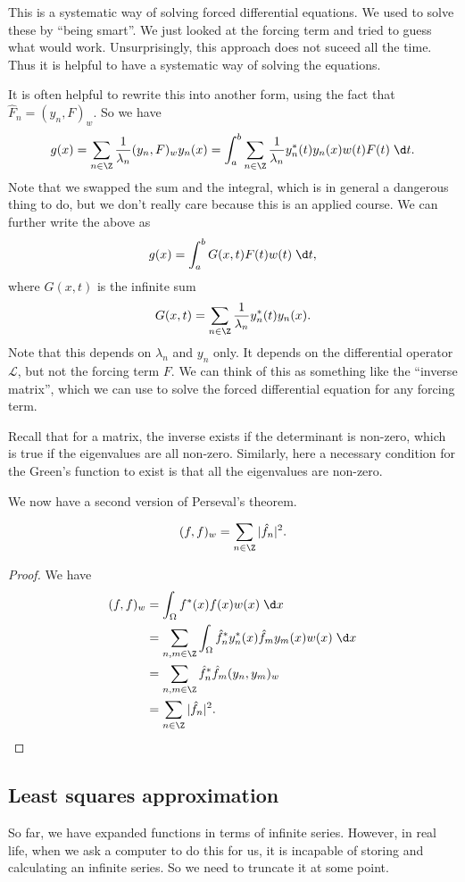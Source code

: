 \documentclass[a4paper]{article}
\begin{document}
This is a systematic way of solving forced differential equations. We used to solve these by ``being smart''. We just looked at the forcing term and tried to guess what would work. Unsurprisingly, this approach does not suceed all the time. Thus it is helpful to have a systematic way of solving the equations.

It is often helpful to rewrite this into another form, using the fact that $\hat{F}_n = (y_n, F)_w$. So we have
\[
  g(x) = \sum_{n \in \Z}\frac{1}{\lambda_n}(y_n, F)_w y_n(x) = \int_a^b \sum_{n \in \Z}\frac{1}{\lambda_n} y_n^*(t) y_n(x) w(t) F(t)\;\d t.
\]
Note that we swapped the sum and the integral, which is in general a dangerous thing to do, but we don't really care because this is an applied course. We can further write the above as
\[
  g(x) = \int_a^b G(x, t) F(t) w(t)\;\d t,
\]
where $G(x, t)$ is the infinite sum
\[
  G(x, t) = \sum_{n \in \Z}\frac{1}{\lambda_n}y_n^*(t) y_n(x).
\]
Note that this depends on $\lambda_n$ and $y_n$ only. It depends on the differential operator $\mathcal{L}$, but not the forcing term $F$. We can think of this as something like the ``inverse matrix'', which we can use to solve the forced differential equation for any forcing term.

Recall that for a matrix, the inverse exists if the determinant is non-zero, which is true if the eigenvalues are all non-zero. Similarly, here a necessary condition for the Green's function to exist is that all the eigenvalues are non-zero.

We now have a second version of Perseval's theorem.
\begin{thm}
  \[
    (f, f)_w = \sum_{n \in \Z}|\hat{f}_n|^2.
  \]
\end{thm}

\begin{proof}
  We have
  \begin{align*}
    (f, f)_w &= \int_\Omega f^*(x) f(x) w(x) \;\d x\\
    &= \sum_{n, m \in \Z}\int_\Omega \hat{f}^*_n y_n^*(x) \hat{f}_m y_m(x)w(x)\;\d x\\
    &= \sum_{n, m\in \Z}\hat{f}^*_n \hat{f}_m (y_n, y_m)_w  \\
    &= \sum_{n \in \Z}|\hat{f}_n|^2.
  \end{align*}
\end{proof}

\subsection{Least squares approximation}
So far, we have expanded functions in terms of infinite series. However, in real life, when we ask a computer to do this for us, it is incapable of storing and calculating an infinite series. So we need to truncate it at some point.
\end{document}

